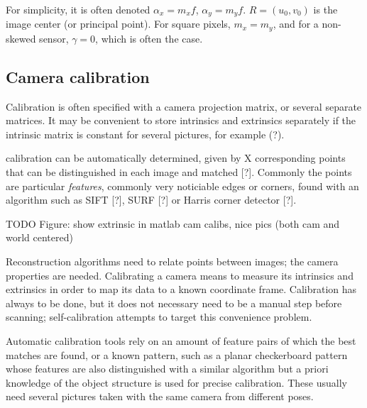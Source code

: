 For simplicity, it is often denoted $\alpha_x = m_x f$, $\alpha_y = m_y f$. $R = (u_0, v_0)$ is the image center (or principal point). For square pixels, $m_x = m_y$, and for a non-skewed sensor, $\gamma = 0$, which is often the case. \cite{hartley03multiview,szeliski10vision,heyden2005multiple}



\subsection{Camera calibration} %

Calibration is often specified with a camera projection matrix, or several separate matrices.
It may be convenient to store intrinsics and extrinsics separately if the intrinsic matrix is constant for several pictures, for example (?).

calibration can be automatically determined, given by X corresponding points that can be distinguished in each image and matched [?]. Commonly the points are particular \emph{features}, commonly very noticiable edges or corners, found with an algorithm such as SIFT [?], SURF [?] or Harris corner detector [?]. %

TODO Figure: show extrinsic in matlab cam calibs, nice pics (both cam and world centered)


Reconstruction algorithms need to relate points between images; the camera properties are needed.
Calibrating a camera means to measure its intrinsics and extrinsics in order to map its data to a known coordinate frame.
Calibration has always to be done, but it does not necessary need to be a manual step before scanning; self-calibration attempts to target this convenience problem. \cite{pollefeys1999hand,hartley03multiview}


Automatic calibration tools rely on an amount of feature pairs of which the best matches are found, or a known pattern, such as a planar checkerboard pattern \cite{chuang2002performance,zhang2000flexible} whose features are also distinguished with a similar algorithm but a priori knowledge of the object structure is used for precise calibration.
These usually need several pictures taken with the same camera from different poses.

